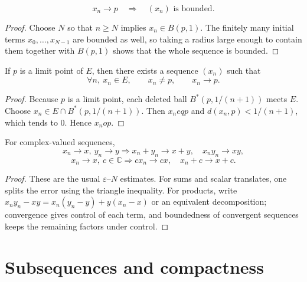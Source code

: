 \begin{theorem}
\label{thm:convergent-bounded}
\[
x_n \to p \quad \Longrightarrow \quad (x_n)\text{ is bounded}.
\]
\begin{proof}
Choose $N$ so that $n\ge N$ implies $x_n\in B(p,1)$. The finitely many initial terms
$x_0,\dots,x_{N-1}$ are bounded as well, so taking a radius large enough to contain them together
with $B(p,1)$ shows that the whole sequence is bounded.
\end{proof}
\end{theorem}

\begin{theorem}
\label{thm:sequence-from-limit-point}
If $p$ is a limit point of $E$, then there exists a sequence $(x_n)$ such that
\[
\forall n,\ x_n \in E,\qquad x_n \ne p,\qquad x_n \to p.
\]
\begin{proof}
Because $p$ is a limit point, each deleted ball $B^\ast(p,1/(n+1))$ meets $E$. Choose
$x_n\in E\cap B^\ast(p,1/(n+1))$. Then $x_n
eq p$ and $d(x_n,p)<1/(n+1)$, which tends to $0$.
Hence $x_n	o p$.
\end{proof}
\end{theorem}

\begin{theorem}
\label{thm:algebra-of-limits}
For complex-valued sequences,
\[
x_n \to x,\ y_n \to y \Longrightarrow x_n+y_n \to x+y,\quad x_ny_n \to xy,
\]
\[
x_n \to x,\ c \in \mathbb{C} \Longrightarrow cx_n \to cx,\quad x_n+c \to x+c.
\]
\begin{proof}
These are the usual $\varepsilon$--$N$ estimates. For sums and scalar translates, one splits the
error using the triangle inequality. For products, write
$x_ny_n-xy=x_n(y_n-y)+y(x_n-x)$ or an equivalent decomposition; convergence gives control of
each term, and boundedness of convergent sequences keeps the remaining factors under control.
\end{proof}
\end{theorem}

\section{Subsequences and compactness}

